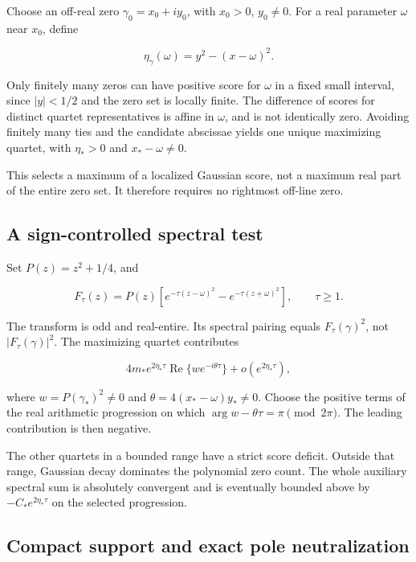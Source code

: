 \documentclass[
  10pt,
  a4paper,
  10pt,
  oneside,
  openany]{book}
\begin{document}
Choose an off-real zero \(\gamma_0=x_0+iy_0\), with \(x_0>0\),
\(y_0\ne0\). For a real parameter \(\omega\) near \(x_0\), define

\[
\eta_\gamma(\omega)=y^2-(x-\omega)^2.
\tag{12.3}\label{eq:12.3}
\]

Only finitely many zeros can have positive score for \(\omega\) in a
fixed small interval, since \(|y|<1/2\) and the zero set is locally
finite. The difference of scores for distinct quartet representatives is
affine in \(\omega\), and is not identically zero. Avoiding finitely
many ties and the candidate abscissae yields one unique maximizing
quartet, with \(\eta_*>0\) and \(x_*-\omega\ne0\).

This selects a maximum of a localized Gaussian score, not a maximum real
part of the entire zero set. It therefore requires no rightmost off-line
zero.

\subsection{A sign-controlled spectral
test}\label{a-sign-controlled-spectral-test}

Set \(P(z)=z^2+1/4\), and

\[
F_\tau(z)=P(z)\left[e^{-\tau(z-\omega)^2}
-e^{-\tau(z+\omega)^2}\right],\qquad\tau\ge1.
\tag{12.4}\label{eq:12.4}
\]

The transform is odd and real-entire. Its spectral pairing equals
\(F_\tau(\gamma)^2\), not \(|F_\tau(\gamma)|^2\). The maximizing quartet
contributes

\[
4m_*e^{2\eta_*\tau}
\operatorname{Re}\{w e^{-i\theta\tau}\}
+o(e^{2\eta_*\tau}),
\tag{12.5}\label{eq:12.5}
\]

where \(w=P(\gamma_*)^2\ne0\) and \(\theta=4(x_*-\omega)y_*\ne0\).
Choose the positive terms of the real arithmetic progression on which
\(\arg w-\theta\tau=\pi\pmod{2\pi}\). The leading contribution is then
negative.

The other quartets in a bounded range have a strict score deficit.
Outside that range, Gaussian decay dominates the polynomial zero count.
The whole auxiliary spectral sum is absolutely convergent and is
eventually bounded above by \(-C_*e^{2\eta_*\tau}\) on the selected
progression.

\subsection{Compact support and exact pole
neutralization}\label{compact-support-and-exact-pole-neutralization}
\end{document}
